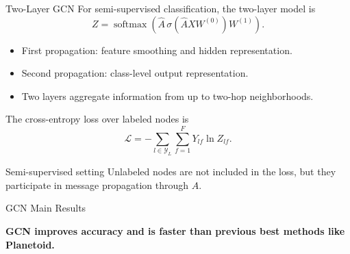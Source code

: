 \documentclass[aspectratio=1610,xcolor=dvipsnames,t]{beamer}
\newcommand{\keyterm}[1]{\textcolor{unirot}{\textbf{#1}}}
\newcommand{\source}[1]{\vspace{0.04cm}{\scriptsize\color{gray} Source: #1}}
\newcommand{\softmax}{\operatorname{softmax}}
\begin{document}
\begin{frame}{Two-Layer GCN}
For semi-supervised classification, the two-layer model is
\[
Z=\softmax\left(
\widehat A\,
\sigma\left(\widehat A XW^{(0)}\right)
W^{(1)}
\right).
\tag{GCN Eq. 9}
\]

\begin{itemize}
  \item First propagation: feature smoothing and hidden representation.
  \item Second propagation: class-level output representation.
  \item Two layers aggregate information from up to two-hop neighborhoods.
\end{itemize}

The cross-entropy loss over labeled nodes is
\[
\mathcal{L}
=
-
\sum_{l\in\mathcal{Y}_L}
\sum_{f=1}^{F}
Y_{lf}\ln Z_{lf}.
\tag{GCN Eq. 10}
\]

\begin{block}{Semi-supervised setting}
Unlabeled nodes are not included in the loss, but they participate in message propagation through $\widehat A$.
\end{block}
\end{frame}

\begin{frame}{GCN Main Results}
\begin{table}
\scriptsize
\centering
{}
\end{table}

\begin{center}
\keyterm{GCN improves accuracy and is faster than previous best methods like Planetoid.}
\end{center}
\source{GCN Table 2.}
\end{frame}
\end{document}
